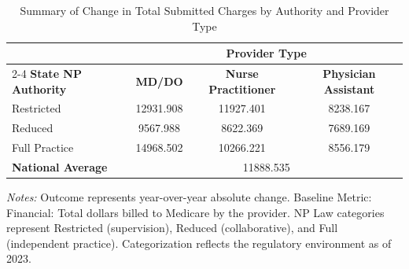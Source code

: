 \begin{table}[htbp]
    \centering
    \caption{Summary of Change in Total Submitted Charges by Authority and Provider Type}
    \label{tab:d_tot_sbmtd_chrg_provtype}
    \vspace{0.2cm}
    \begin{tabular}{lccc}
        \toprule
        & \multicolumn{3}{c}{\textbf{Provider Type}} \\
        \cmidrule(lr){2-4}
        \textbf{State NP Authority} & \textbf{MD/DO} & \textbf{Nurse Practitioner} & \textbf{Physician Assistant} \\
        \midrule
        Restricted & 12931.908 & 11927.401 & 8238.167 \\
        Reduced & 9567.988 & 8622.369 & 7689.169 \\
        Full Practice & 14968.502 & 10266.221 & 8556.179 \\
        \midrule
        \textbf{National Average} & \multicolumn{3}{c}{11888.535} \\
        \bottomrule
    \end{tabular}
    \vspace{0.1cm}
    \begin{minipage}{0.85\textwidth}
        \footnotesize \textit{Notes:} Outcome represents year-over-year absolute change. Baseline Metric: Financial: Total dollars billed to Medicare by the provider. NP Law categories represent Restricted (supervision), Reduced (collaborative), and Full (independent practice). Categorization reflects the regulatory environment as of 2023.
    \end{minipage}
\end{table}